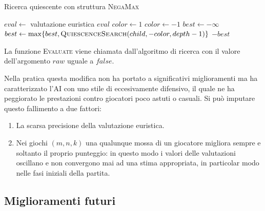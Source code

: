 \documentclass{article}
\begin{document}
\begin{algorithm}[H]
  \caption{Ricerca quiescente con struttura \textsc{NegaMax}}
  \label{qs}
  \begin{algorithmic}[0]
      \State $eval \gets $ valutazione euristica
        \State \Return $eval$
      \Else
        \State $color \gets 1$
          \State $color \gets -1$
        \EndIf
        \State \Return {}
      \EndIf
    \EndProcedure
    \Statex
      \State \Return {}
    \EndIf
    \State $best \gets -\infty$
      \State $best \gets \max\{best, \Call{QuiescenceSearch}{child, -color, depth-1}\}$
    \EndFor
    \State \Return $-best$
    \EndProcedure
  \end{algorithmic}
\end{algorithm}

La funzione \textsc{Evaluate} viene chiamata dall'algoritmo di ricerca con il valore
dell'argomento $raw$ uguale a $false$.

Nella pratica questa modifica non ha portato a significativi miglioramenti
ma ha caratterizzato l'AI con uno stile di eccesivamente difensivo, il quale ne
ha peggiorato le prestazioni contro giocatori poco astuti o casuali.
Si pu\`o imputare questo fallimento a due fattori:
\begin{enumerate}
  \item La scarsa precisione della valutazione euristica.
  \item Nei giochi $(m, n, k)$ una qualunque mossa di un giocatore migliora sempre
    e soltanto il proprio punteggio: in questo modo i valori delle valutazioni
    oscillano e non convergono mai ad una stima appropriata, in particolar modo
    nelle fasi iniziali della partita.
\end{enumerate}

\subsection*{Miglioramenti futuri}
\end{document}
